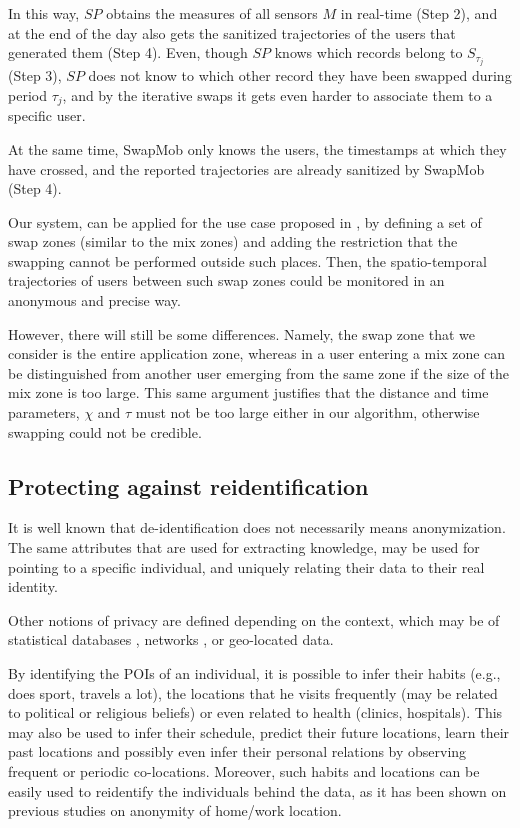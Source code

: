 \documentclass[review]{elsarticle}
\begin{document}
In this way, $SP$ obtains the measures of all sensors $M$ in real-time (Step 2), and at the end of the day also gets the sanitized trajectories of the users that generated them (Step 4).
Even, though $SP$ knows which records belong to $S_{\tau_j}$ (Step 3), $SP$ does not know to which other record they have been swapped during period $\tau_j$, and by the iterative swaps it gets even harder to associate them to a specific user.

At the same time, SwapMob only knows the users, the timestamps at which they have crossed, and the reported trajectories are already sanitized by SwapMob (Step 4).

Our system, can be applied for the use case proposed in \cite{Beresford2003}, by defining a set of swap zones (similar to the mix zones) and adding the restriction that the swapping cannot be performed outside such places. Then, the spatio-temporal trajectories of users between such swap zones could be monitored in an anonymous and precise way.


However, there will still be some differences. Namely, the swap zone that we consider is the entire application zone, whereas in \cite{Beresford2003} a user entering a mix zone can be distinguished from another user emerging from the same zone if the size of the mix zone is too large.  
This same argument justifies that the distance and time parameters, $\chi$ and $\tau$ must not be too large either in our algorithm, otherwise swapping could not be credible.



\subsection{Protecting against reidentification} %
It is well known that de-identification does not necessarily means anonymization. The same attributes that are used for extracting knowledge, may be used for pointing to a specific individual, and uniquely relating their data to their real identity.

Other notions of privacy are defined depending on the context, which may be of statistical databases \cite{Danezis15}, networks \cite{Zhou:2008}, or geo-located data.

By identifying the POIs of an individual, it is possible to infer their habits (e.g., does sport, travels a lot), the locations that he visits frequently (may be related to political or religious beliefs) or even related to health (clinics, hospitals). This may also be used to infer their schedule, predict their future locations, learn their past locations and possibly even infer their personal relations by observing frequent or periodic co-locations.
Moreover, such habits and locations can be easily used to reidentify the individuals behind the data, as it has been shown on previous studies on anonymity of home/work location.
\end{document}
